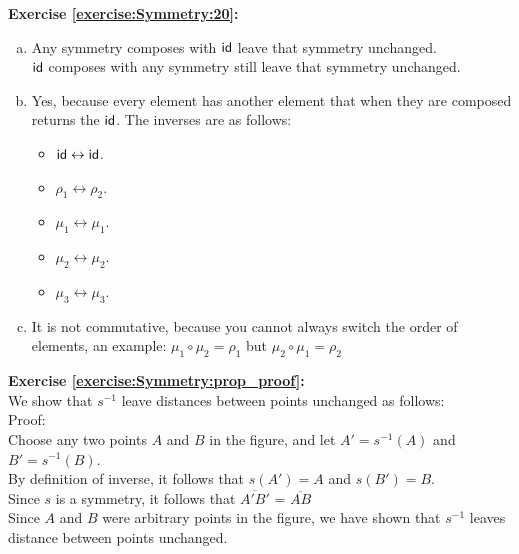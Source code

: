 \noindent\textbf{Exercise \ref{exercise:Symmetry:20}:}
\begin{enumerate}[(a)]
\item
Any symmetry composes with $\sf{id}$ leave that symmetry unchanged.\\
$\sf{id}$ composes with any symmetry still leave that symmetry unchanged.

\item
Yes, because every element has another element that when they are composed returns the $\sf{id}$. The inverses are as follows:\\
	\begin{multicols}{3}
	\begin{itemize}
	\item
	$\sf{id} \leftrightarrow \sf{id}$.
	
	\item
	$\rho_1 \leftrightarrow \rho_2$.
	
	\item
	$\mu_1 \leftrightarrow \mu_1$.
	
	\item
	$\mu_2 \leftrightarrow \mu_2$.
	
	\item
	$\mu_3 \leftrightarrow \mu_3$.
	\end{itemize}
	\end{multicols}
	
\item
It is not commutative, because you cannot always switch the order of elements, an example: $\mu_1\circ \mu_2 = \rho_1$ but $\mu_2\circ \mu_1=\rho_2$
\end{enumerate}

\noindent\textbf{Exercise \ref{exercise:Symmetry:prop_proof}:}\\
We show that $s^{-1}$ leave distances between points unchanged as follows:\\
Proof:\\
Choose any two points $A$ and $B$ in the figure, and let $A'=s^{-1}(A)$ and $B'=s^{-1}(B)$.\\
By definition of inverse, it follows that $s(A')=A$ and $s(B')=B$.\\
Since $s$ is a symmetry, it follows that $\overline{A'B'}$ = $\overline{AB}$\\
Since $A$ and $B$ were arbitrary points in the figure, we have shown that $s^{-1}$ leaves distance between points unchanged.

